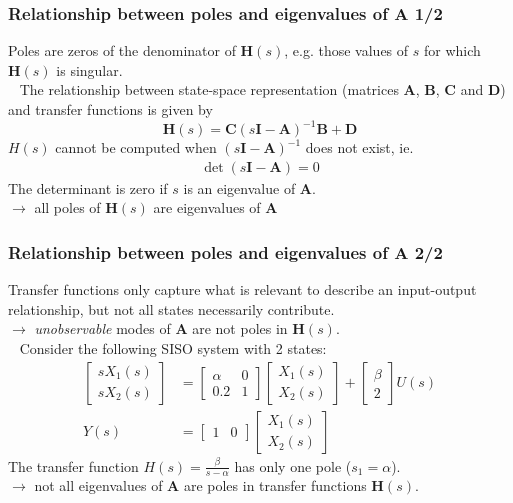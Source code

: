 \begin{frame}
\frametitle{Relationship between poles and eigenvalues of $\mathbf{A}$ 1/2}
Poles are zeros of the denominator of $\mathbf{H}(s)$, e.g. those values of $s$ for which $\mathbf{H}(s)$ is singular.\\ \pause
\ \newline
The relationship between state-space representation (matrices $\mathbf{A}$, $\mathbf{B}$, $\mathbf{C}$ and $\mathbf{D}$) and transfer functions is given by
\begin{equation*}
\mathbf{H}(s) = \mathbf{C} (s\mathbf{I}-\mathbf{A})^{-1} \mathbf{B} + \mathbf{D}
\end{equation*}
\pause
$H(s)$ cannot be computed when $(s\mathbf{I}-\mathbf{A})^{-1}$ does not exist, ie.
\begin{align*}
\det(s\mathbf{I}-\mathbf{A}) = 0
\end{align*}
\pause
The determinant is zero if $s$ is an eigenvalue of $\mathbf{A}$.\\ \pause
$\rightarrow$ {\color{blue}all poles of $\mathbf{H}(s)$ are eigenvalues of $\mathbf{A}$}
\end{frame}

\begin{frame}
\frametitle{Relationship between poles and eigenvalues of $\mathbf{A}$ 2/2}
Transfer functions only capture what is relevant to describe an input-output relationship, but not all states necessarily contribute.\pause\\
$\rightarrow$ \emph{unobservable} modes of $\mathbf{A}$ are not poles in $\mathbf{H}(s)$. \\
\pause
\ \newline
Consider the following SISO system with 2 states:
\begin{align*}
\begin{bmatrix} sX_1(s) \\ sX_2(s) \end{bmatrix} &= \begin{bmatrix} \alpha & 0 \\ 0.2 & 1 \end{bmatrix} \begin{bmatrix} X_1(s) \\ X_2(s) \end{bmatrix} + \begin{bmatrix} \beta \\ 2 \end{bmatrix} U(s) \\
Y(s) &= \begin{bmatrix} 1 & 0 \end{bmatrix} \begin{bmatrix} X_1(s) \\ X_2(s) \end{bmatrix}
\end{align*}
\pause
The transfer function $H(s) = \frac{\beta}{s-\alpha}$ has only one pole ($s_1 = \alpha$). \\
$\rightarrow$ {\color{blue}not all eigenvalues of $\mathbf{A}$ are poles in transfer functions $\mathbf{H}(s)$.}
\end{frame}


